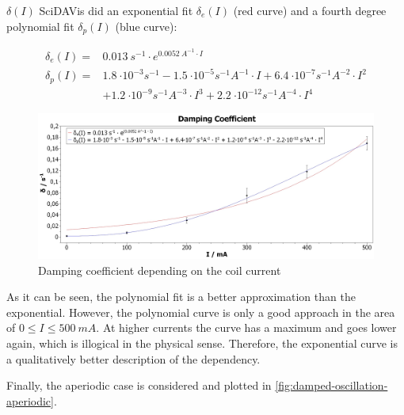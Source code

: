             \(\delta(I)\) SciDAVis did an exponential fit \(\delta_e(I)\) (red curve) and a fourth degree polynomial fit
            \(\delta_p(I)\) (blue curve):\par
            \begin{align}
                \delta_e(I)=&\SI{0.013}{s^{-1}}\cdot e^{\SI{0.0052}{A^{-1}}\cdot I}\\
                \delta_p(I)=&\SI{1.8}{\cdot 10^{-3}s^{-1}} - \SI{1.5}{\cdot 10^{-5}s^{-1}A^{-1}}\cdot I + \SI{6.4}{\cdot 10^{-7}s^{-1}A^{-2}}\cdot I^2 \nonumber\\
                            &+ \SI{1.2}{\cdot 10^{-9}s^{-1}A^{-3}}\cdot I^3 + \SI{2.2}{\cdot 10^{-12}s^{-1}A^{-4}}\cdot I^4
            \end{align}
            \begin{figure}
                \centering
                \includegraphics[width=1\linewidth]{"messdaten/Damping Coefficient"}
                \caption[Damping coefficient depending on the coil current]{Damping coefficient depending on the coil current}
                \label{fig:damping-coefficient}
            \end{figure}
            As it can be seen, the polynomial fit is a better approximation than the exponential. However, the polynomial curve
            is only a good approach in the area of \(0 \leq I \leq \SI{500}{mA}\). At higher currents the curve has a maximum
            and goes lower again, which is illogical in the physical sense. Therefore, the exponential curve is a qualitatively
            better description of the dependency.\par\medskip
            Finally, the aperiodic case is considered and plotted in \cref{fig:damped-oscillation-aperiodic}.\par
